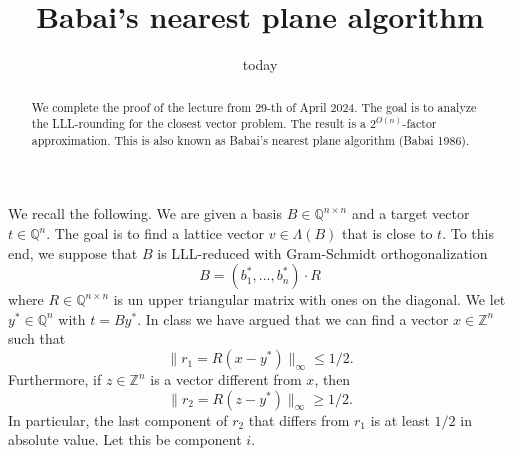 \documentclass[11pt,a4paper]{article}
\title{Babai's nearest plane algorithm}
\date{ today}
\begin{document}
\maketitle
\begin{abstract}
  \noindent 
  We complete the proof of the lecture from 29-th of April 2024. The goal is to analyze the LLL-rounding for the closest vector problem. The result is a $2^{O(n)}$-factor approximation. This is also known as Babai's nearest plane algorithm (Babai 1986). 
\end{abstract}



\noindent 
We recall the following. We are given a basis $B ∈ ℚ^{n ×n}$ and a target vector $t ∈ ℚ^n$. The goal is to find a lattice vector $v ∈ Λ(B)$  that is close to $t$. To this end, we suppose that $B$ is LLL-reduced with Gram-Schmidt orthogonalization
\begin{displaymath}
  B = \left( b_1^*,\dots,b_n^* \right) ⋅ R
\end{displaymath}
where $R∈ ℚ^{n × n}$ is un upper triangular matrix with ones on the diagonal. We let $y^* ∈ ℚ^n$ with $t = B y^*$. In class we have argued that we can find a vector $x ∈ℤ^n$ such that
\begin{equation}
  \label{eq:1}
  \| r_1 =  R (x - y^*)\|_∞ ≤ 1/2. 
\end{equation}
Furthermore, if $z ∈ℤ^n$ is a vector different from $x$, then
\begin{equation}
  \label{eq:1}
  \| r_2 = R (z - y^*)\|_∞ ≥ 1/2. 
\end{equation}
In particular, the last component of $r_2$ that differs from $r_1$   is at least $1/2$ in absolute value. Let this be component $i$. 




%
%

 
\end{document}
